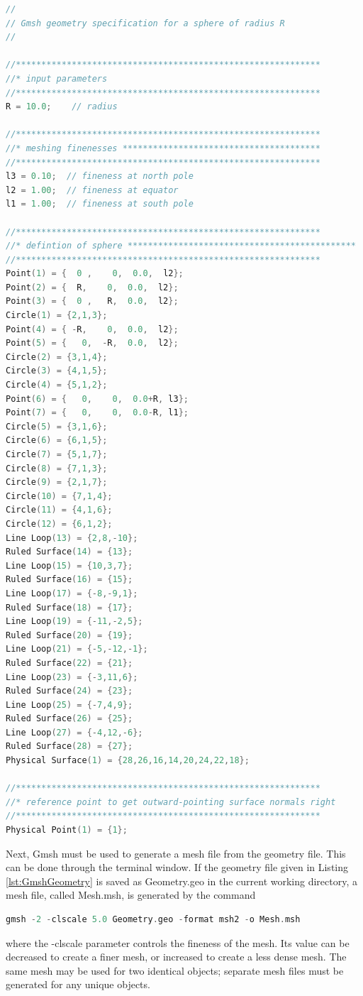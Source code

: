 \singlespacing
\begin{lstlisting}[language=C++, caption={Gmsh geometry file for a sphere.}, label={lst:GmshGeometry}]
//
// Gmsh geometry specification for a sphere of radius R
// 

//************************************************************
//* input parameters      
//************************************************************
R = 10.0;    // radius

//************************************************************
//* meshing finenesses ***************************************
//************************************************************
l3 = 0.10;  // fineness at north pole
l2 = 1.00;  // fineness at equator
l1 = 1.00;  // fineness at south pole

//************************************************************
//* defintion of sphere *********************************************
//************************************************************
Point(1) = {  0 ,    0,  0.0,  l2};
Point(2) = {  R,    0,  0.0,  l2};
Point(3) = {  0 ,   R,  0.0,  l2};
Circle(1) = {2,1,3};
Point(4) = { -R,    0,  0.0,  l2};
Point(5) = {   0,  -R,  0.0,  l2};
Circle(2) = {3,1,4};
Circle(3) = {4,1,5};
Circle(4) = {5,1,2};
Point(6) = {   0,    0,  0.0+R, l3};
Point(7) = {   0,    0,  0.0-R, l1};
Circle(5) = {3,1,6};
Circle(6) = {6,1,5};
Circle(7) = {5,1,7};
Circle(8) = {7,1,3};
Circle(9) = {2,1,7};
Circle(10) = {7,1,4};
Circle(11) = {4,1,6};
Circle(12) = {6,1,2};
Line Loop(13) = {2,8,-10};
Ruled Surface(14) = {13};
Line Loop(15) = {10,3,7};
Ruled Surface(16) = {15};
Line Loop(17) = {-8,-9,1};
Ruled Surface(18) = {17};
Line Loop(19) = {-11,-2,5};
Ruled Surface(20) = {19};
Line Loop(21) = {-5,-12,-1};
Ruled Surface(22) = {21};
Line Loop(23) = {-3,11,6};
Ruled Surface(24) = {23};
Line Loop(25) = {-7,4,9};
Ruled Surface(26) = {25};
Line Loop(27) = {-4,12,-6};
Ruled Surface(28) = {27};
Physical Surface(1) = {28,26,16,14,20,24,22,18};

//************************************************************
//* reference point to get outward-pointing surface normals right
//************************************************************
Physical Point(1) = {1};
\end{lstlisting}
\doublespacing

Next, Gmsh must be used to generate a mesh file from the geometry file. This can be done through the terminal window. If the geometry file given in Listing \ref{lst:GmshGeometry} is saved as Geometry.geo in the current working directory, a mesh file, called Mesh.msh, is generated by the command
%
\begin{lstlisting}[language=C++]
gmsh -2 -clscale 5.0 Geometry.geo -format msh2 -o Mesh.msh
\end{lstlisting}
%
where the -clscale parameter controls the fineness of the mesh. Its value can be decreased to create a finer mesh, or increased to create a less dense mesh. The same mesh may be used for two identical objects; separate mesh files must be generated for any unique objects.  


